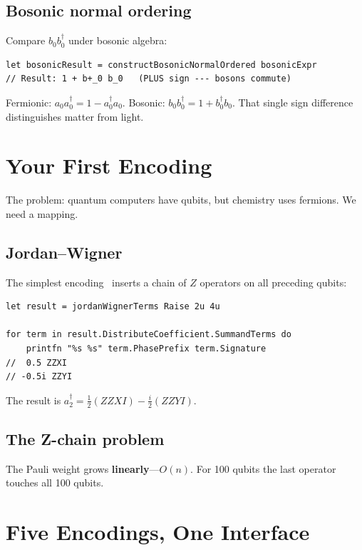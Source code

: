 \documentclass[10pt,a4paper]{article}
\begin{document}
\subsection{Bosonic normal ordering}

Compare $b_0 b^\dagger_0$ under bosonic algebra:

\begin{lstlisting}
let bosonicResult = constructBosonicNormalOrdered bosonicExpr
// Result: 1 + b+_0 b_0   (PLUS sign --- bosons commute)
\end{lstlisting}

Fermionic: $a_0 a^\dagger_0 = 1 - a^\dagger_0 a_0$.
Bosonic: $b_0 b^\dagger_0 = 1 + b^\dagger_0 b_0$.
That single sign difference distinguishes matter from light.


\section{Your First Encoding}\label{ch:first}

The problem: quantum computers have qubits, but chemistry uses fermions.
We need a mapping.

\subsection{Jordan--Wigner}

The simplest encoding~\cite{jordan1928} inserts a chain of $Z$
operators on all preceding qubits:

\begin{lstlisting}
let result = jordanWignerTerms Raise 2u 4u

for term in result.DistributeCoefficient.SummandTerms do
    printfn "%s %s" term.PhasePrefix term.Signature
//  0.5 ZZXI
// -0.5i ZZYI
\end{lstlisting}

The result is $a^\dagger_2 = \tfrac{1}{2}(ZZXI) -
\tfrac{i}{2}(ZZYI)$.

\subsection{The Z-chain problem}

The Pauli weight grows \textbf{linearly}---$O(n)$.  For 100 qubits the
last operator touches all 100 qubits.


\section{Five Encodings, One Interface}\label{ch:five}
\end{document}
